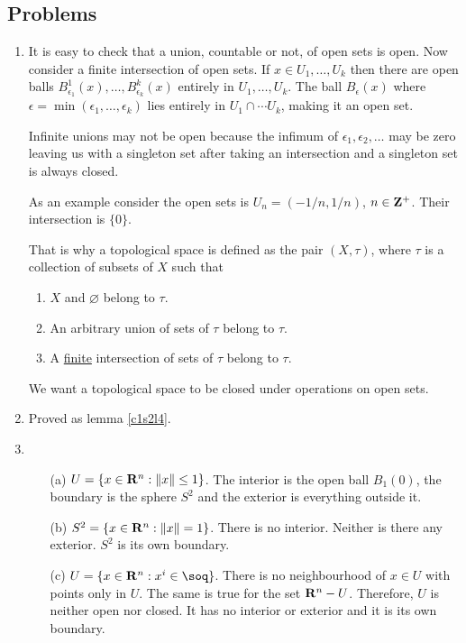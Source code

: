 \subsection{Problems}
\begin{enumerate}
\item It is easy to check that a union, countable or not, of open sets is open.
Now consider a finite intersection of open sets. If $x \in U_1, \ldots, U_k$
then there are open balls $B^1_{\epsilon_1}(x), \ldots, B^k_{\epsilon_k}(x)$
entirely in $U_1, \ldots, U_k$. The ball $B_\epsilon(x)$ where $\epsilon = 
\min(\epsilon_1, \ldots, \epsilon_k)$ lies entirely in $U_1 \cap \cdots U_k$,
making it an open set.

Infinite unions may not be open because the infimum of $\epsilon_1, \epsilon_2,
\ldots$ may be zero leaving us with a singleton set after taking an intersection
and a singleton set is always closed.

As an example consider the open sets is $U_n = (-1/n, 1/n)$, $n \in \mathbf{Z}^+$.
Their intersection is $\{0\}$.

\begin{rem}
That is why a topological space is defined as the pair $(X, \tau)$, where $\tau$
is a collection of subsets of $X$ such that
\begin{enumerate}
\item $X$ and $\varnothing$ belong to $\tau$.
\item An arbitrary union of sets of $\tau$ belong to $\tau$.
\item A \underline{finite} intersection of sets of $\tau$ belong to $\tau$.
\end{enumerate}
We want a topological space to be closed under operations on open sets.
\end{rem}

\item Proved as lemma \ref{c1s2l4}.

\item 
\begin{enumerate}
\item[(a)] $U = \{x \in \mathbf{R}^n : \left\Vert{x}\right\Vert \le 1\}$. The interior is the open
ball $B_1(0)$, the boundary is the sphere $S^2$ and the exterior is everything
outside it.
\item[(b)] $S^2 = \{x \in \mathbf{R}^n : \left\Vert{x}\right\Vert = 1\}$. There is no interior. 
Neither is there any exterior. $S^2$ is its own boundary.
\item[(c)] $U = \{x \in \sor^n : x^i \in \soq\}$. There is no neighbourhood of 
$x \in U$ with points only in $U$. The same is true for the set $\mathbf{R}^n - U$.
Therefore, $U$ is neither open nor closed. It has no interior or exterior and
it is its own boundary.
\end{enumerate}


\end{enumerate}
